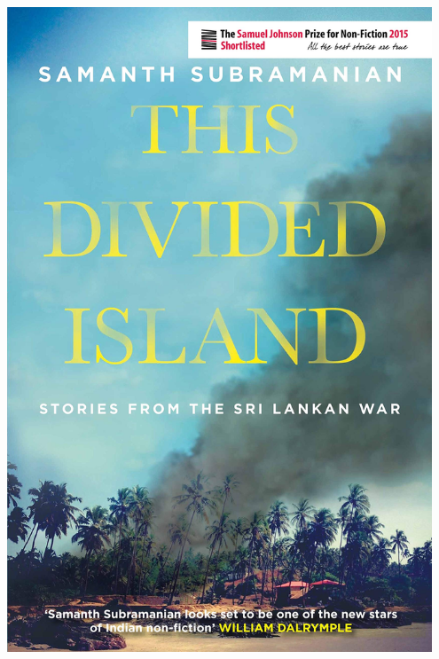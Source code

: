 \documentclass[aspectratio=43]{beamer}
\begin{document}
\begin{frame}
\begin{minipage}{0.45\textwidth}
\includegraphics[width = 0.95\textwidth]{img/this_divided_island}
\end{minipage}

\end{frame}
\end{document}
